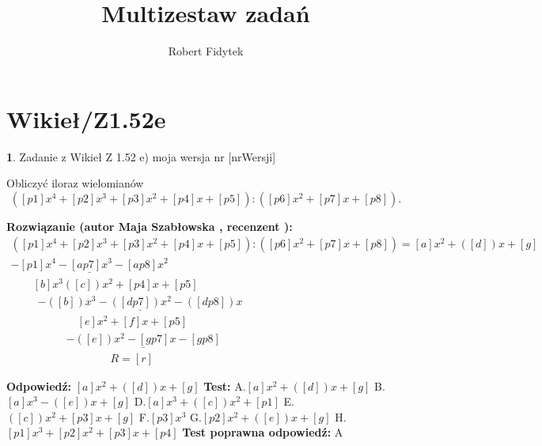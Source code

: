 \documentclass[12pt, a4paper]{article}
\title{Multizestaw zadań}
\author{Robert Fidytek}
\date{}
\theoremstyle{definition} %
\newtheorem{zad}{}
\newcommand{\kategoria}[1]{\section{#1}} %
\newcommand{\zadStart}[1]{\begin{zad}#1\newline} %
\newcommand{\zadStop}{\end{zad}}   %
\newcommand{\rozwStart}[2]{\noindent \textbf{Rozwiązanie (autor #1 , recenzent #2): }\newline} %
\newcommand{\rozwStop}{\newline}                                            %
\newcommand{\odpStart}{\noindent \textbf{Odpowiedź:}\newline}    %
\newcommand{\odpStop}{\newline}                                             %
\newcommand{\testStart}{\noindent \textbf{Test:}\newline} %
\newcommand{\testStop}{\newline} %
\newcommand{\kluczStart}{\noindent \textbf{Test poprawna odpowiedź:}\newline} %
\newcommand{\kluczStop}{\newline} %
\begin{document}
\maketitle


\kategoria{Wikieł/Z1.52e}
\zadStart{Zadanie z Wikieł Z 1.52 e)  moja wersja nr [nrWersji]}

Obliczyć iloraz wielomianów $$([p1]x^{4}+[p2]x^{3}+[p3]x^{2}+[p4]x+[p5]):([p6]x^{2}+[p7]x+[p8]).$$

\zadStop

\rozwStart{Maja Szabłowska}{}
$$\begin{array}{lll}
([p1]x^{4}+[p2]x^{3}+[p3]x^{2}+[p4]x+[p5]):([p6]x^{2}+[p7]x+[p8])  =   [a]x^2  +([d])x +[g] \\
\underline{-[p1]x^4 -[ap7]x^3-[ap8]x^{2}} & &  \\
\qquad [b]x^3  ([c])x^2 +[p4]x +[p5] & & \\
\qquad \ \ \underline{-([b])x^3 -([dp7])x^2 -([dp8])x} & &\\
\qquad \qquad \qquad [e]x^2 + [f]x + [p5] & & \\
\qquad \qquad \quad \underline{-([e])x^2 - [gp7]x - [gp8]}  & & \\
\qquad \qquad \qquad \qquad \quad R = [r] & &
\end{array}$$
\rozwStop


\odpStart
$[a]x^2  +([d])x +[g]$
\odpStop
\testStart
A.$[a]x^2  +([d])x +[g]$
B.$[a]x^3 - ([e])x +[g]$
D.$[a]x^3 +([c])x^2 +[p1]$
E.$([c])x^2 + [p3]x +[g]$
F.$[p3]x^3 $
G.$[p2]x^2 + ([e])x +[g]$
H.$[p1]x^3 +[p2]x^2 + [p3]x +[p4]$
\testStop
\kluczStart
A
\kluczStop
\end{document}
